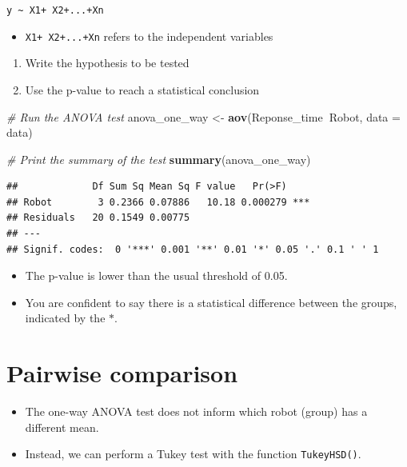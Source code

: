 \documentclass[]{book}
\newenvironment{Shaded}{\begin{snugshade}}{\end{snugshade}}
\newcommand{\CommentTok}[1]{\textcolor[rgb]{0.56,0.35,0.01}{\textit{#1}}}
\newcommand{\DataTypeTok}[1]{\textcolor[rgb]{0.13,0.29,0.53}{#1}}
\newcommand{\KeywordTok}[1]{\textcolor[rgb]{0.13,0.29,0.53}{\textbf{#1}}}
\newcommand{\NormalTok}[1]{#1}
\newcommand{\OperatorTok}[1]{\textcolor[rgb]{0.81,0.36,0.00}{\textbf{#1}}}
\newcommand{\StringTok}[1]{\textcolor[rgb]{0.31,0.60,0.02}{#1}}
\providecommand{\tightlist}{%
  \setlength{\itemsep}{0pt}\setlength{\parskip}{0pt}}
\begin{document}
\texttt{y\ \textasciitilde{}\ X1+\ X2+...+Xn}

\begin{itemize}
\tightlist
\item
  \texttt{X1+\ X2+...+Xn} refers to the independent variables
\end{itemize}

\begin{enumerate}
\def\labelenumi{\alph{enumi})}
\item
  Write the hypothesis to be tested
\item
  Use the p-value to reach a statistical conclusion
\end{enumerate}

\begin{Shaded}
\begin{Highlighting}[]
\CommentTok{# Run the ANOVA test }
\NormalTok{anova_one_way <-}\StringTok{ }\KeywordTok{aov}\NormalTok{(Reponse_time}\OperatorTok{~}\NormalTok{Robot, }\DataTypeTok{data =}\NormalTok{ data)}

\CommentTok{# Print the summary of the test}
\KeywordTok{summary}\NormalTok{(anova_one_way)}
\end{Highlighting}
\end{Shaded}

\begin{verbatim}
##             Df Sum Sq Mean Sq F value   Pr(>F)    
## Robot        3 0.2366 0.07886   10.18 0.000279 ***
## Residuals   20 0.1549 0.00775                     
## ---
## Signif. codes:  0 '***' 0.001 '**' 0.01 '*' 0.05 '.' 0.1 ' ' 1
\end{verbatim}

\begin{itemize}
\item
  The p-value is lower than the usual threshold of 0.05.
\item
  You are confident to say there is a statistical difference between the groups, indicated by the \(*\).
\end{itemize}

\hypertarget{pairwise-comparison}{%
\section{Pairwise comparison}\label{pairwise-comparison}}

\begin{itemize}
\item
  The one-way ANOVA test does not inform which robot (group) has a different mean.
\item
  Instead, we can perform a Tukey test with the function \texttt{TukeyHSD()}.
\end{itemize}
\end{document}
